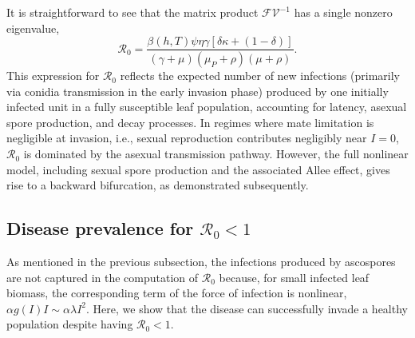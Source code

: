 \documentclass[11pt]{article}
\numberwithin{equation}{section}
\begin{document}
It is straightforward to see that the matrix product $\mathcal{F V}^{-1}$ has a single nonzero eigenvalue,
\begin{equation}\label{eqn5}
    \mathcal{R}_0=\frac{\beta(h,T)\psi\eta\gamma[\delta\kappa+(1-\delta)]}{(\gamma+\mu)(\mu_P+\rho)(\mu+\rho)}.
\end{equation}
This expression for $  \mathcal{R}_0  $ reflects the expected number of new infections (primarily via conidia transmission in the early invasion phase) produced by one initially infected unit in a fully susceptible leaf population, accounting for latency, asexual spore production, and decay processes. In regimes where mate limitation is negligible at invasion, i.e., sexual reproduction contributes negligibly near $I = 0$, $\mathcal{R}_0$ is dominated by the asexual transmission pathway. However, the full nonlinear model, including sexual spore production and the associated Allee effect, gives rise to a backward bifurcation, as demonstrated subsequently.

\subsection{Disease prevalence for \texorpdfstring{$\mathcal{R}_0<1$}{R0<1}}
As mentioned in the previous subsection, the infections produced by ascospores are not captured in the computation of $\mathcal{R}_0$ because, for small infected leaf biomass, the corresponding term of the force of infection is nonlinear, $\alpha g(I)I\sim \alpha\lambda I^2$. Here, we show that the disease can successfully invade a healthy population despite having $\mathcal{R}_0<1$.
\end{document}
